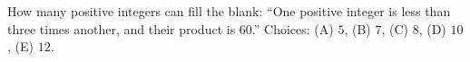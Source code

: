 How many positive integers can fill the blank: ``One positive integer is \underline{\hspace{2em}} less than three times another, and their product is $60$.'' Choices: (A) $5$, (B) $7$, (C) $8$, (D) $10$, (E) $12$.
